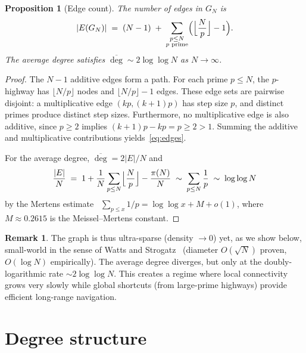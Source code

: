 \documentclass[11pt]{article}
\theoremstyle{plain}
\newtheorem{proposition}[theorem]{Proposition}
\theoremstyle{definition}
\newtheorem{remark}[theorem]{Remark}
\begin{document}
\begin{proposition}[Edge count]\label{prop:edges}
The number of edges in $G_N$ is
\begin{equation}\label{eq:edges}
|E(G_N)| \;=\; (N - 1) \;+\; \sum_{\substack{p \le N \\ p \textup{ prime}}} \Bigl(\Bigl\lfloor \frac{N}{p} \Bigr\rfloor - 1\Bigr).
\end{equation}
The average degree satisfies $\overline{\deg} \sim 2\log\log N$ as $N \to \infty$.
\end{proposition}

\begin{proof}
The $N - 1$ additive edges form a path. For each prime $p \le N$,
the $p$-highway has $\lfloor N/p \rfloor$ nodes and $\lfloor N/p \rfloor - 1$ edges.
These edge sets are pairwise disjoint: a multiplicative edge $(kp, (k+1)p)$ has
step size $p$, and distinct primes produce distinct step sizes.
Furthermore, no multiplicative edge is also additive, since $p \ge 2$ implies
$(k+1)p - kp = p \ge 2 > 1$. Summing the additive and multiplicative contributions yields~\eqref{eq:edges}.

For the average degree, $\overline{\deg} = 2|E|/N$ and
\[
\frac{|E|}{N} \;=\; 1 + \frac{1}{N}\sum_{p \le N}\Bigl\lfloor \frac{N}{p}\Bigr\rfloor - \frac{\pi(N)}{N}
\;\sim\; \sum_{p \le N} \frac{1}{p} \;\sim\; \log\log N
\]
by the Mertens estimate~\cite{Mertens1874} $\sum_{p \le x} 1/p = \log\log x + M + o(1)$,
where $M \approx 0.2615$ is the Meissel--Mertens constant.
\end{proof}

\begin{remark}
The graph is thus ultra-sparse (density $\to 0$) yet, as we show below,
small-world in the sense of Watts and Strogatz~\cite{Watts1998}
(diameter $O(\sqrt{N})$ proven, $O(\log N)$ empirically). The average degree diverges, but only at the
doubly-logarithmic rate $\sim 2\log\log N$. This creates a regime where
local connectivity grows very slowly while global shortcuts (from large-prime
highways) provide efficient long-range navigation.
\end{remark}


\section{Degree structure}
\end{document}
